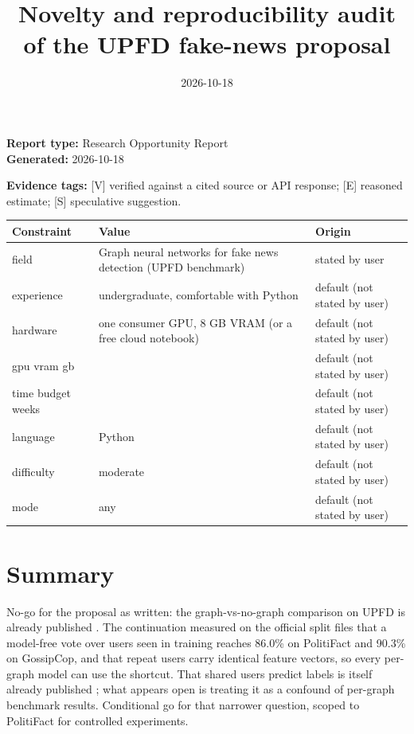 \documentclass[11pt,a4paper]{article}
\title{Novelty and reproducibility audit of the UPFD fake-news proposal}
\date{2026-10-18}
\begin{document}
\maketitle


\textbf{Report type:} Research Opportunity Report\\
\textbf{Generated:} 2026-10-18

\textbf{Evidence tags:} [V] verified against a cited source or API response; [E] reasoned estimate; [S] speculative suggestion.

{\small
\begin{longtable}{>{\raggedright\arraybackslash}p{}>{\raggedright\arraybackslash}p{}>{\raggedright\arraybackslash}p{}}
\toprule
\textbf{Constraint} & \textbf{Value} & \textbf{Origin} \\
\midrule
\endhead
field & Graph neural networks for fake news detection (UPFD benchmark) & stated by user \\
experience & undergraduate, comfortable with Python & default (not stated by user) \\
hardware & one consumer GPU, 8 GB VRAM (or a free cloud notebook) & default (not stated by user) \\
gpu vram gb & 8 & default (not stated by user) \\
time budget weeks & 8 & default (not stated by user) \\
language & Python & default (not stated by user) \\
difficulty & moderate & default (not stated by user) \\
mode & any & default (not stated by user) \\
\bottomrule
\end{longtable}
}

\section{Summary}

No-go for the proposal as written: the graph-vs-no-graph comparison on UPFD is already published \cite{karn2025structure,dou2021upfd}. The continuation measured on the official split files that a model-free vote over users seen in training reaches 86.0\% on PolitiFact and 90.3\% on GossipCop, and that repeat users carry identical feature vectors, so every per-graph model can use the shortcut. That shared users predict labels is itself already published \cite{jeong2022hgfnd}; what appears open is treating it as a confound of per-graph benchmark results. Conditional go for that narrower question, scoped to PolitiFact for controlled experiments.
\end{document}
